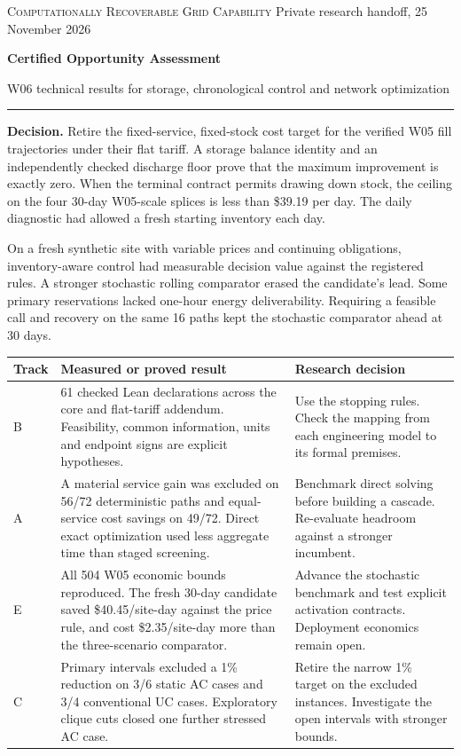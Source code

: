 \documentclass[10pt,letterpaper]{article}
\begin{document}
{\small\textsc{Computationally Recoverable Grid Capability} \hfill Private research handoff, 25 November 2026}\par
\vspace{8pt}
{\color{ink}\fontsize{24}{27}\selectfont\bfseries Certified Opportunity Assessment}\par
{\large W06 technical results for storage, chronological control and network optimization}\par
\vspace{4pt}\hrule\vspace{5pt}
\textbf{Decision.} Retire the fixed-service, fixed-stock cost target for the verified W05 fill trajectories under their flat tariff. A storage balance identity and an independently checked discharge floor prove that the maximum improvement is exactly zero. When the terminal contract permits drawing down stock, the ceiling on the four 30-day W05-scale splices is less than \$39.19 per day. The daily diagnostic had allowed a fresh starting inventory each day.

On a fresh synthetic site with variable prices and continuing obligations, inventory-aware control had measurable decision value against the registered rules. A stronger stochastic rolling comparator erased the candidate's lead. Some primary reservations lacked one-hour energy deliverability. Requiring a feasible call and recovery on the same 16 paths kept the stochastic comparator ahead at 30 days.

\begin{tabularx}{\linewidth}{@{}p{.075\linewidth}Xp{.33\linewidth}@{}}
\toprule
Track & Measured or proved result & Research decision\\\midrule
B & 61 checked Lean declarations across the core and flat-tariff addendum. Feasibility, common information, units and endpoint signs are explicit hypotheses. & Use the stopping rules. Check the mapping from each engineering model to its formal premises.\\
A & A material service gain was excluded on 56/72 deterministic paths and equal-service cost savings on 49/72. Direct exact optimization used less aggregate time than staged screening. & Benchmark direct solving before building a cascade. Re-evaluate headroom against a stronger incumbent.\\
E & All 504 W05 economic bounds reproduced. The fresh 30-day candidate saved \$40.45/site-day against the price rule, and cost \$2.35/site-day more than the three-scenario comparator. & Advance the stochastic benchmark and test explicit activation contracts. Deployment economics remain open.\\
C & Primary intervals excluded a 1\% reduction on 3/6 static AC cases and 3/4 conventional UC cases. Exploratory clique cuts closed one further stressed AC case. & Retire the narrow 1\% target on the excluded instances. Investigate the open intervals with stronger bounds.\\\bottomrule
\end{tabularx}
\end{document}
